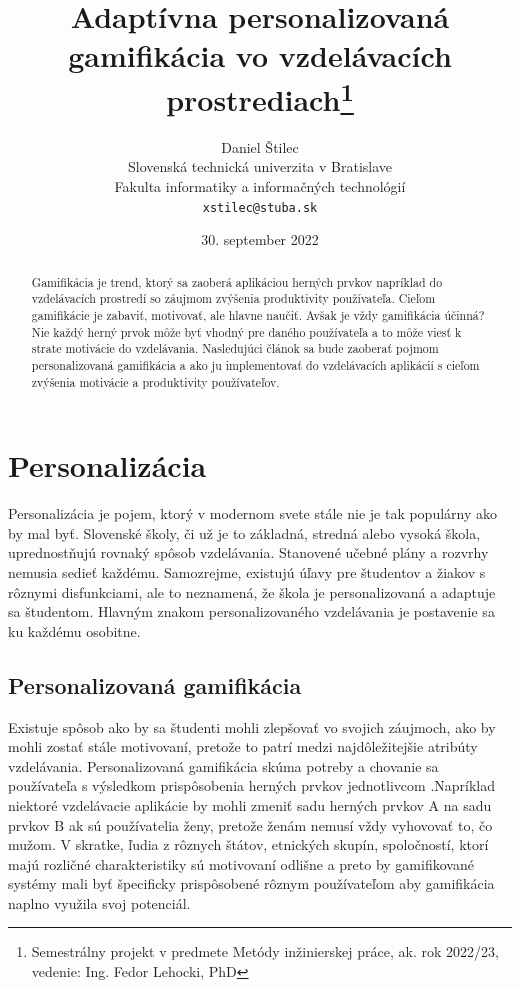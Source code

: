 \documentclass[10pt,twoside,slovak,a4paper]{article}
\title{Adaptívna personalizovaná gamifikácia vo vzdelávacích prostrediach\thanks{Semestrálny projekt v predmete Metódy inžinierskej práce, ak. rok 2022/23, vedenie: Ing. Fedor Lehocki, PhD}} %
\author{Daniel Štilec\\[2pt]
	{\small Slovenská technická univerzita v Bratislave}\\
	{\small Fakulta informatiky a informačných technológií}\\
	{\small \texttt{xstilec@stuba.sk}}
	}
\date{\small 30. september 2022} %
\begin{document}
\maketitle

\begin{abstract}
Gamifikácia je trend, ktorý sa zaoberá aplikáciou herných prvkov napríklad do vzdelávacích prostredí so záujmom zvýšenia produktivity používateľa. Cieľom gamifikácie je zabaviť, motivovať, ale hlavne naučiť. Avšak je vždy gamifikácia účinná? Nie každý herný prvok môže byť vhodný pre daného používateľa a to môže viesť k strate motivácie do vzdelávania. Nasledujúci článok sa bude zaoberať pojmom personalizovaná gamifikácia a ako ju implementovať do vzdelávacích aplikácií s cieľom zvýšenia motivácie a produktivity používateľov.
\end{abstract}


\section{Personalizácia} \label{personalizacia}

	Personalizácia je pojem, ktorý v modernom svete stále nie je tak populárny ako by mal byť. Slovenské školy, či už je to základná, stredná alebo vysoká škola, uprednostňujú rovnaký spôsob vzdelávania. Stanovené učebné plány a rozvrhy nemusia sedieť každému. Samozrejme, existujú úľavy pre študentov a žiakov s rôznymi disfunkciami, ale to neznamená, že škola je personalizovaná a adaptuje sa študentom. Hlavným znakom personalizovaného vzdelávania je postavenie sa ku každému osobitne.

\subsection{Personalizovaná gamifikácia} \label{personalizacia:gamifikacia}

	Existuje spôsob ako by sa študenti mohli zlepšovať vo svojich záujmoch, ako by mohli zostať stále motivovaní, pretože to patrí medzi najdôležitejšie atribúty vzdelávania. Personalizovaná gamifikácia skúma potreby a chovanie sa používateľa s výsledkom prispôsobenia herných prvkov jednotlivcom \cite{personalizovana} .Napríklad niektoré vzdelávacie aplikácie by mohli zmeniť sadu herných prvkov A na sadu prvkov B ak sú používatelia ženy, pretože ženám nemusí vždy vyhovovať to, čo mužom. V skratke, ľudia z rôznych štátov, etnických skupín, spoločností, ktorí majú rozličné charakteristiky sú motivovaní odlišne a preto by gamifikované systémy mali byť špecificky prispôsobené rôznym používateľom aby gamifikácia naplno využila svoj potenciál. 
\end{document}
